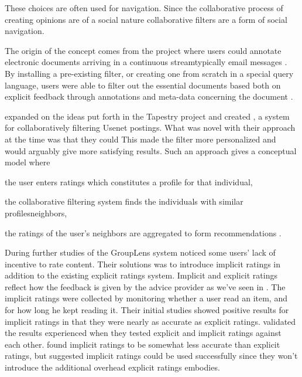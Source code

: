  
These choices are often used for navigation. Since the collaborative process
of creating opinions are of a social nature collaborative filters are a form
of social navigation.

The origin of the concept comes from the 
project where users could annotate electronic documents arriving in a
continuous stream\dash{}typically email messages \citep[]{goldberg92}. By
installing a pre-existing filter, or creating one from scratch in a
special query language, users were able to filter out the essential documents
based both on explicit feedback through annotations and
meta-data concerning the document \citep[]{goldberg92}.

\citet{resnick94} expanded on the ideas put forth in the Tapestry project
and created ,
a system for collaboratively filtering Usenet postings. What was novel with
their approach at the time was that they could
This made the filter more personalized and would arguably give more
satisfying results. Such an approach gives a conceptual model where
\begin{inparaenum}[(i)]
  \item the user enters ratings which constitutes a profile
    for that individual,
  \item the collaborative filtering system finds
    the individuals with similar profiles\dash{}neighbors,
  \item the ratings of the user's neighbors are aggregated
    to form recommendations \citep[]{herlocker00}.
\end{inparaenum}

During further studies of the GroupLens system \citet[]{konstan97}
noticed some users' lack of incentive to rate content. Their solutions
was to introduce implicit ratings in addition to the existing explicit ratings
system. Implicit and explicit ratings reflect how the feedback is given by the
advice provider as we've seen in
.
The implicit ratings were collected by monitoring whether a user read
an item, and for how long he kept reading it. Their initial studies showed
positive results for implicit ratings in that they were nearly as accurate as
explicit ratings. \citet[]{claypool01} validated the results
\citeauthor{konstan97} experienced when they tested explicit and implicit
ratings against each other. \citeauthor{claypool01} found implicit ratings
to be somewhat less accurate than explicit ratings, but suggested implicit
ratings could be used successfully since they won't introduce the additional
overhead explicit ratings embodies.


